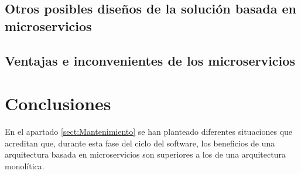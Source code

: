 \documentclass[11pt,spanish,listoffigures]{tfgetsinf}
\begin{document}
\section{Otros posibles diseños de la solución basada en microservicios}

\section{Ventajas e inconvenientes de los microservicios}


\chapter{Conclusiones} \label{ch:Conclusiones}

En el apartado \ref{sect:Mantenimiento}  se han planteado diferentes situaciones que acreditan que, durante esta fase del ciclo del software, los beneficios de una arquitectura basada en microservicios son superiores a los de una arquitectura monolítica.







\APPENDIX

%
\end{document}
